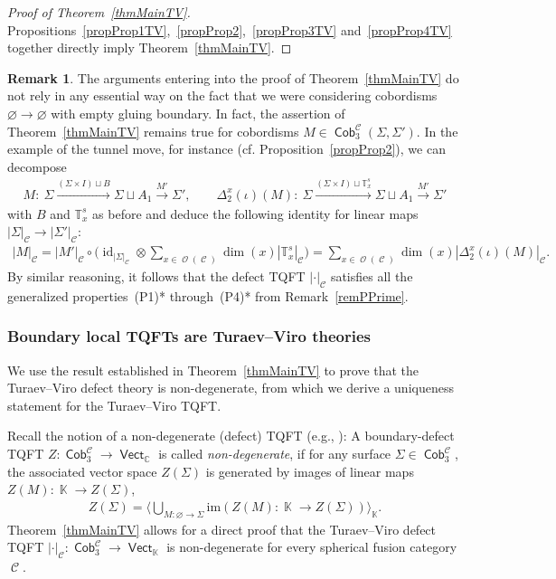 \documentclass[10pt,a4paper]{amsart}
\DeclareMathOperator{\id}{id}
\DeclareMathOperator{\vect}{\mathsf{Vect}}
\DeclareMathOperator{\K}{\mathbb{K}}
\DeclareMathOperator{\C}{\mathbb{C}}
\DeclareMathOperator{\Cob}{\mathsf{Cob}}
\DeclareMathOperator{\calc}{\mathcal{C}}
\DeclareMathOperator{\calo}{\mathcal{O}}
\numberwithin{equation}{section}
\theoremstyle{definition}
\newtheorem{Remark}[Remark]{Remark}
\begin{document}
\begin{proof}[Proof of Theorem~\ref{thmMainTV}]
 Propositions~\ref{propProp1TV},~\ref{propProp2},~\ref{propProp3TV} and~\ref{propProp4TV} together directly imply Theorem~\ref{thmMainTV}.
\end{proof}
\begin{Remark}\label{remTVPPrime}
The arguments entering into the proof of Theorem~\ref{thmMainTV} do not rely in any essential way on the fact that we were considering cobordisms $\varnothing \rightarrow \varnothing$ with empty gluing boundary. In fact, the assertion of Theorem~\ref{thmMainTV} remains true for cobordisms $M \in \Cob_3^{\calc}(\Sigma, \Sigma')$. In the example of the tunnel move, for instance (cf. Proposition~\ref{propProp2}), we can decompose
 \begin{align*}
 M\colon \ \Sigma \xrightarrow{(\Sigma \times I) \sqcup B} \Sigma \sqcup A_1 \xrightarrow{M'} \Sigma', \qquad \Delta_2^x(\iota)(M)\colon \ \Sigma \xrightarrow{(\Sigma \times I) \sqcup \mathbb{T}_x^s} \Sigma \sqcup A_1 \xrightarrow{M'} \Sigma'
 \end{align*}
 with $B$ and $\mathbb{T}_x^s$ as before and deduce the following identity for linear maps $|\Sigma|_{\calc} \rightarrow |\Sigma'|_{\calc}$:
 \begin{align*}
 \allowbreak |M|_{\calc} = |M'|_{\calc} \circ \biggl(\id_{|\Sigma|_{\calc}} \otimes \sum_{x \in \calo(\calc)}\dim(x)|\mathbb{T}_x^s|_{\calc} \biggr) = \sum_{x \in \calo(\calc)}\dim(x)|\Delta_2^x(\iota)(M)|_{\calc}.
 \end{align*}
 By similar reasoning, it follows that the defect TQFT $|\cdot|_{\calc}$ satisfies all the generalized properties~(P1)* through~(P4)* from Remark~\ref{remPPrime}.
\end{Remark}

\subsubsection{Boundary local TQFTs are Turaev--Viro theories}\label{subsecND}
We use the result established in Theorem~\ref{thmMainTV} to prove that the Turaev--Viro defect theory is non-degenerate, from which we derive a uniqueness statement for the Turaev--Viro TQFT.

Recall the notion of a non-degenerate (defect) TQFT (e.g., \cite[Section 15.2.3]{TV}): A boundary-defect TQFT $Z\colon \Cob_3^{\calc} \rightarrow \vect_{\C}$ is called \textit{non-degenerate}, if for any surface $\Sigma \in \Cob_3^{\calc}$, the associated vector space $Z(\Sigma)$ is generated by images of linear maps $Z(M)\colon \K \rightarrow Z(\Sigma)$,
\begin{align*}
 Z(\Sigma) = \biggl \langle \bigcup_{M\colon \varnothing \rightarrow \Sigma} \mathrm{im} ( Z(M)\colon \K \rightarrow Z(\Sigma) )\biggr\rangle_{\K}.
\end{align*}
Theorem~\ref{thmMainTV} allows for a direct proof that the Turaev--Viro defect TQFT $|\cdot|_{\calc}\colon \Cob_3^{\calc} \rightarrow \vect_{\K}$ is non-degenerate for every spherical fusion category $\calc$.
\end{document}
